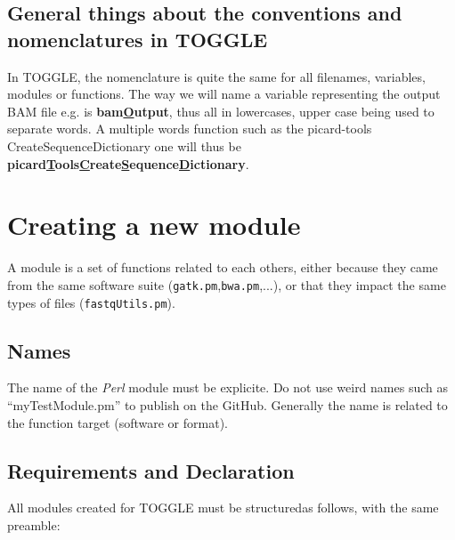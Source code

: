 \documentclass[a4paper,10pt]{report}
\begin{document}
\section{General things about the conventions and nomenclatures in TOGGLE}

In TOGGLE, the nomenclature is quite the same for all filenames, variables, modules or functions.
The way we will name a variable representing the output BAM file e.g. is \textbf{bam\underline{O}utput}, thus all in lowercases, upper case being used to separate words. A multiple words function such as the picard-tools CreateSequenceDictionary one will thus be \textbf{picard\underline{T}ools\underline{C}reate\underline{S}equence\underline{D}ictionary}.


\chapter{Creating a new module}
A module is a set of functions related to each others, either because they came from the same software suite (\texttt{gatk.pm},\texttt{bwa.pm},...), or that they impact the same types of files (\texttt{fastqUtils.pm}).

\section{Names}
The name of the \textit{Perl} module must be explicite. Do not use weird names such as ``myTestModule.pm'' to publish on the GitHub.
Generally the name is related to the function target (software or format).

\section{Requirements and Declaration}

All modules created for TOGGLE must be structuredas follows, with the same preamble:
\end{document}
